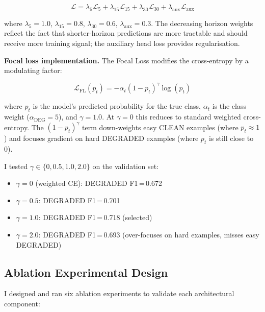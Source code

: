 \documentclass[12pt,a4paper]{article}
\begin{document}
\begin{equation}
  \mathcal{L} = \lambda_5 \mathcal{L}_5 + \lambda_{15} \mathcal{L}_{15}
  + \lambda_{30} \mathcal{L}_{30} + \lambda_\mathrm{aux} \mathcal{L}_\mathrm{aux}
\end{equation}

where $\lambda_5 = 1.0$, $\lambda_{15} = 0.8$, $\lambda_{30} = 0.6$,
$\lambda_\mathrm{aux} = 0.3$.
The decreasing horizon weights reflect the fact that shorter-horizon predictions are more
tractable and should receive more training signal; the auxiliary head loss provides
regularisation.

\textbf{Focal loss implementation.}
The Focal Loss \cite{lin2017focal} modifies the cross-entropy by a modulating factor:

\begin{equation}
  \mathcal{L}_\mathrm{FL}(p_t) = -\alpha_t (1-p_t)^\gamma \log(p_t)
\end{equation}

where $p_t$ is the model's predicted probability for the true class,
$\alpha_t$ is the class weight ($\alpha_\mathrm{DEG} = 5$), and $\gamma = 1.0$.
At $\gamma = 0$ this reduces to standard weighted cross-entropy.
The $(1-p_t)^\gamma$ term down-weights easy CLEAN examples (where $p_t \approx 1$)
and focuses gradient on hard DEGRADED examples (where $p_t$ is still close to 0).

I tested $\gamma \in \{0, 0.5, 1.0, 2.0\}$ on the validation set:
\begin{itemize}
  \item $\gamma = 0$ (weighted CE): DEGRADED F1\,=\,0.672
  \item $\gamma = 0.5$: DEGRADED F1\,=\,0.701
  \item $\gamma = 1.0$: DEGRADED F1\,=\,0.718 (selected)
  \item $\gamma = 2.0$: DEGRADED F1\,=\,0.693 (over-focuses on hard examples, misses easy DEGRADED)
\end{itemize}

\subsection{Ablation Experimental Design}

I designed and ran six ablation experiments to validate each architectural component:
\end{document}
